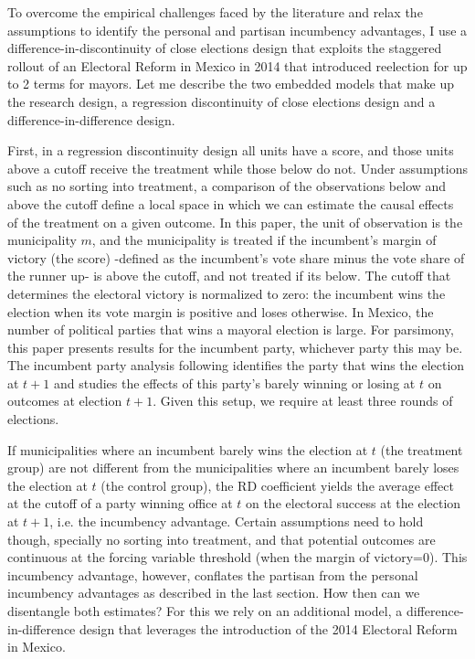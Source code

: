 \documentclass[12pt]{amsart}
\makeatletter
\def\subsection{\@startsection{subsection}{2}
	\z@{.8\linespacing\@plus.7\linespacing}{.7\linespacing}{\large}}
\numberwithin{equation}{section}
\theoremstyle{definition}
\theoremstyle{definition}
\theoremstyle{definition}
\makeatother
\begin{document}
\subsection{Research Design}

To overcome the empirical challenges faced by the literature and relax the assumptions to identify the personal and partisan incumbency advantages, I use a difference-in-discontinuity of close elections design that exploits the staggered rollout of an Electoral Reform in Mexico in 2014 that introduced reelection for up to 2 terms for mayors. Let me describe the two embedded models that make up the research design, a regression discontinuity of close elections design and a difference-in-difference design. 

First, in a regression discontinuity design all units have a score, and those units above a cutoff receive the treatment while those below do not. Under assumptions such as no sorting into treatment, a comparison of the observations below and above the cutoff define a local space in which we can estimate the causal effects of the treatment on a given outcome. In this paper, the unit of observation is the municipality $m$, and the municipality is treated if the incumbent's margin of victory (the score) -defined as the incumbent's vote share minus the vote share of the runner up- is above the cutoff, and not treated if its below. The cutoff that determines the electoral victory is normalized to zero: the incumbent wins the election when its vote margin is positive and loses otherwise. In Mexico, the number of political parties that wins a mayoral election is large. For parsimony, this paper presents results for the incumbent party, whichever party this may be. The incumbent party analysis following \citet{klasnja_titiunik_2017} identifies the party that wins the election at $t+1$ and studies the effects of this party's barely winning or losing at $t$ on outcomes at election $t+1$. Given this setup, we require at least three rounds of elections. 

If municipalities where an incumbent barely wins the election at $t$ (the treatment group) are not different from the municipalities where an incumbent barely loses the election at $t$ (the control group), the RD coefficient yields the average effect at the cutoff of a party winning office at $t$ on the electoral success at the election at $t+1$, i.e. the incumbency advantage. Certain assumptions need to hold though, specially no sorting into treatment, and that potential outcomes are continuous at the forcing variable threshold (when the margin of victory=0). This incumbency advantage, however, conflates the partisan from the personal incumbency advantages as described in the last section. How then can we disentangle both estimates? For this we rely on an additional model, a difference-in-difference design that leverages the introduction of the 2014 Electoral Reform in Mexico.
\end{document}
